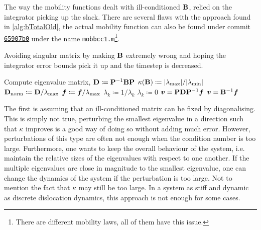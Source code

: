 The way the mobility functions dealt with ill-conditioned $\mathbf{B}$, relied on the integrator picking up the slack. There are several flaws with the approach found in \cref{alg:bTotalOld}, the actual mobility function can also be found under commit \href{https://github.com/TarletonGroup/EasyDD/blob/65907b022d1fe408fc1b2e5c5ca2bd1797ccae04/mobbcc1.m#L68}{\texttt{65907b0}} under the name \texttt{mobbcc1.m}\footnote{There are different mobility laws, all of them have this issue.}.
\begin{algorithm}
    \caption{Avoiding singular matrix by making $\mathbf{B}$ extremely wrong and hoping the integrator error bounds pick it up and the timestep is decreased.}
    \label{alg:bTotalOld}
    \begin{algorithmic}
        \State Compute eigenvalue matrix, $\mathbf{D} \coloneqq \mathbf{P}^{-1} \mathbf{B} \mathbf{P}$
        \State $\kappa(\mathbf{B}) \coloneqq \lvert \lambda_{\textrm{max}} \rvert/ \lvert \lambda_{\textrm{min}} \rvert$
        \State $\mathbf{D}_{\textrm{norm}} \coloneqq \mathbf{D} / \lambda_{\textrm{max}}$
        \State $\vec{f} \coloneqq \vec{f} / \lambda_{\rvar{max}}$
        \State $\lambda_k \coloneqq 1/\lambda_k$
        \Else
        \State $\lambda_k \coloneqq 0$
        \EndIf
        \EndFor
        \State $\vec{v} = \mtx{P} \mtx{D} \mtx{P}^{-1} \vec{f}$
        \Else
        \State $\vec{v} = \mtx{B}^{-1} \vec{f}$
        \EndIf
    \end{algorithmic}
\end{algorithm}

The first is assuming that an ill-conditioned matrix can be fixed by diagonalising. This is simply not true, perturbing the smallest eigenvalue in a direction such that $\kappa$ improves is a good way of doing so without adding much error. However, perturbations of this type are often not enough when the condition number is too large. Furthermore, one wants to keep the overall behaviour of the system, i.e. maintain the relative sizes of the eigenvalues with respect to one another. If the multiple eigenvalues are close in magnitude to the smallest eigenvalue, one can change the dynamics of the system if the perturbation is too large. Not to mention the fact that $\kappa$ may still be too large. In a system as stiff and dynamic as discrete dislocation dynamics, this approach is not enough for some cases.

